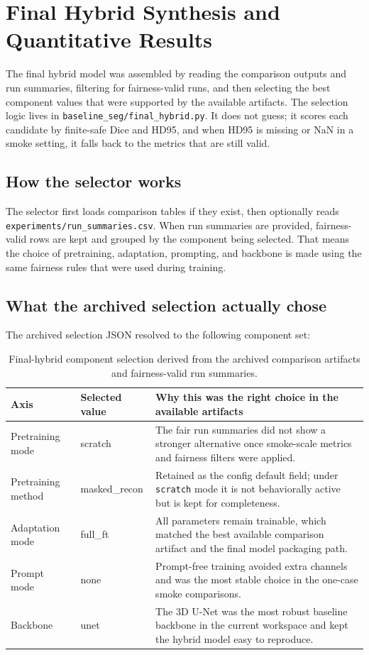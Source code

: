 \documentclass[11pt,a4paper]{article}
\begin{document}
\section{Final Hybrid Synthesis and Quantitative Results}
The final hybrid model was assembled by reading the comparison outputs and run summaries, filtering for fairness-valid runs, and then selecting the best component values that were supported by the available artifacts. The selection logic lives in \texttt{baseline\_seg/final\_hybrid.py}. It does not guess; it scores each candidate by finite-safe Dice and HD95, and when HD95 is missing or NaN in a smoke setting, it falls back to the metrics that are still valid.

\subsection{How the selector works}
The selector first loads comparison tables if they exist, then optionally reads \texttt{experiments/run\_summaries.csv}. When run summaries are provided, fairness-valid rows are kept and grouped by the component being selected. That means the choice of pretraining, adaptation, prompting, and backbone is made using the same fairness rules that were used during training.

\subsection{What the archived selection actually chose}
The archived selection JSON resolved to the following component set:

\begin{table}[H]
\centering
\begin{tabular}{p{}p{}p{}}
\toprule
Axis & Selected value & Why this was the right choice in the available artifacts \\
\midrule
Pretraining mode & scratch & The fair run summaries did not show a stronger alternative once smoke-scale metrics and fairness filters were applied. \\
Pretraining method & masked\_recon & Retained as the config default field; under \texttt{scratch} mode it is not behaviorally active but is kept for completeness. \\
Adaptation mode & full\_ft & All parameters remain trainable, which matched the best available comparison artifact and the final model packaging path. \\
Prompt mode & none & Prompt-free training avoided extra channels and was the most stable choice in the one-case smoke comparisons. \\
Backbone & unet & The 3D U-Net was the most robust baseline backbone in the current workspace and kept the hybrid model easy to reproduce. \\
\bottomrule
\end{tabular}
\caption{Final-hybrid component selection derived from the archived comparison artifacts and fairness-valid run summaries.}
\label{tab:final_hybrid_selection}
\end{table}
\end{document}

